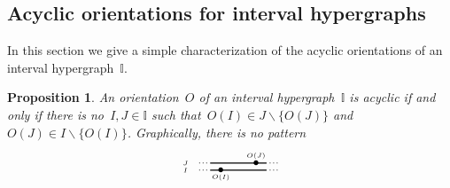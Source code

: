 \documentclass{amsart}
\newtheorem{proposition}[theorem]{Proposition}
\theoremstyle{definition}
\newcommand{\ssm}{\smallsetminus} %
\newcommand{\II}{\mathbb I} %
\begin{document}

\subsection{Acyclic orientations for interval hypergraphs}
\label{subsec:acyclicI}

In this section we give a simple characterization of the acyclic orientations of an interval hypergraph~$\II$.

\begin{proposition}
\label{prop:acyclicI}
An orientation~$O$ of an interval hypergraph~$\II$ is acyclic if and only if there is no~$I,J \in \II$ such that~$O(I) \in J \ssm \{O(J)\}$ and~$O(J) \in I \ssm \{O(I)\}$.
Graphically, there is no pattern
 \[
	\begin{tikzpicture}[scale=1,baseline=.0cm]
	\node at (-.5,0.2) {$\scriptscriptstyle J$}; 
	\node at (-.1,0.2) {$\scriptstyle \cdot$};
	\node at (0,0.2) {$\scriptstyle \cdot$};
	\node at (.1,0.2) {$\scriptstyle \cdot$};
	\draw [thick] (.2,.2)--(1.8,.2);
	\node at (1.9,.2) {$\scriptstyle \cdot$};
	\node at (2,.2) {$\scriptstyle \cdot$};
	\node at (2.1,.2) {$\scriptstyle \cdot$};
	\node at (1.5,.2) {$\bullet$};
	\node at (-.5,0) {$\scriptscriptstyle I$};
	\node at (-.1,0) {$\scriptstyle \cdot$};
	\node at (0,0) {$\scriptstyle \cdot$};
	\node at (.1,0) {$\scriptstyle \cdot$};
	\draw [thick] (.2,0)--(1.8,0);
	\node at (1.9,0) {$\scriptstyle \cdot$};
	\node at (2,0) {$\scriptstyle \cdot$};
	\node at (2.1,0) {$\scriptstyle \cdot$};
	\node at (.5,0) {$\bullet$};
	\node at (.5,-.2) {$\scriptscriptstyle O(I)$};
	\node at (1.5,.4) {$\scriptscriptstyle O(J)$}; 
	\end{tikzpicture}
\]
\end{proposition}
\end{document}

